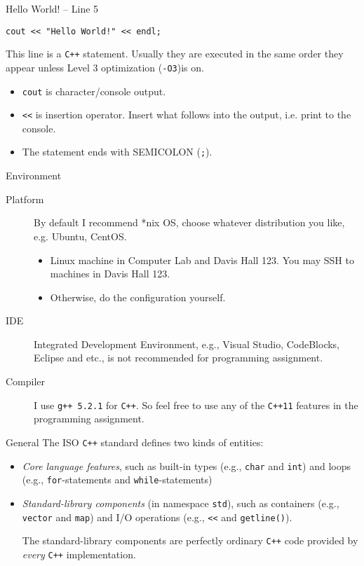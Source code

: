 \documentclass[presentation]{beamer}
\begin{document}
\begin{frame}[fragile,label={sec:orgheadline9}]{Hello World! -- Line 5}
 \begin{verbatim}
cout << "Hello World!" << endl;
\end{verbatim}

This line is a \texttt{C++} statement.  Usually they are executed in the
same order they appear unless Level 3 optimization (\texttt{-O3})is on.

\begin{itemize}
\item \texttt{cout} is character/console output.
\item \texttt{<<} is insertion operator.  Insert what follows into the output,
i.e. print to the console.
\item The statement ends with \alert{SEMICOLON (\texttt{;})}.
\end{itemize}
\end{frame}

\begin{frame}[fragile,label={sec:orgheadline10}]{Environment}
 \begin{description}
\item[{Platform}] By default I recommend *nix OS, choose whatever
distribution you like, e.g. Ubuntu, CentOS.
\begin{itemize}
\item Linux machine in Computer Lab and Davis Hall 123.  You may SSH
to machines in Davis Hall 123.
\item Otherwise, do the configuration yourself.
\end{itemize}
\item[{IDE}] Integrated Development Environment, e.g., Visual Studio,
CodeBlocks, Eclipse and etc., is not recommended for
programming assignment.
\item[{Compiler}] I use \texttt{g++ 5.2.1} for \texttt{C++}.  So feel free to use any
of the \texttt{C++11} features in the programming assignment.
\end{description}
\end{frame}

\begin{frame}[fragile,label={sec:orgheadline11}]{General}
 The ISO \texttt{C++} standard defines two kinds of entities:
\begin{itemize}
\item \emph{Core language features}, such as built-in types (e.g., \texttt{char} and
\texttt{int}) and loops (e.g., \texttt{for}-statements and \texttt{while}-statements)
\item \emph{Standard-library components} (in namespace \texttt{std}), such as
containers (e.g., \texttt{vector} and \texttt{map}) and I/O operations (e.g.,
\texttt{<<} and \texttt{getline()}).

The standard-library components are perfectly ordinary \texttt{C++} code
provided by \emph{every} \texttt{C++} implementation.
\end{itemize}
\end{frame}
\end{document}
